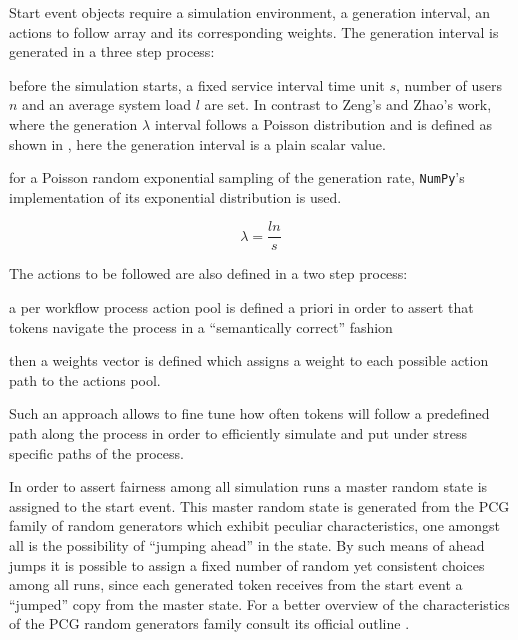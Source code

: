 \documentclass{seal_thesis}
\begin{document}
Start event objects require a simulation environment, a generation interval, an actions to follow array and its corresponding weights. The generation interval is generated in a three step process:
\begin{enumerate*}
 	\item before the simulation starts, a fixed service interval time unit $s$, number of users $n$ and an average system load $l$ are set. In contrast to Zeng's and Zhao's work, where the generation $\lambda$ interval follows a Poisson distribution \cite{Zeng2005} and is defined as shown in , here the generation interval is a plain scalar value.
 	\item for a Poisson random exponential sampling of the generation rate, \texttt{NumPy}'s implementation of its exponential distribution is used.
 \end{enumerate*}

\begin{equation}
\label{eq:generation_interval}
	\lambda = \frac{l n}{s}
\end{equation}

The actions to be followed are also defined in a two step process:
\begin{enumerate*}
	\item a per workflow process action pool is defined a priori in order to assert that tokens navigate the process in a ``semantically correct'' fashion
	\item then a weights vector is defined which assigns a weight to each possible action path to the actions pool.
\end{enumerate*}

Such an approach allows to fine tune how often tokens will follow a predefined path along the process in order to efficiently simulate and put under stress specific paths of the process.

In order to assert fairness among all simulation runs a master random state is assigned to the start event. This master random state is generated from the PCG family of random generators which exhibit peculiar characteristics, one amongst all is the possibility of ``jumping ahead'' in the state. By such means of ahead jumps it is possible to assign a fixed number of random yet consistent choices among all runs, since each generated token receives from the start event a ``jumped'' copy from the master state. For a better overview of the characteristics of the PCG random generators family consult its official outline .
\end{document}
